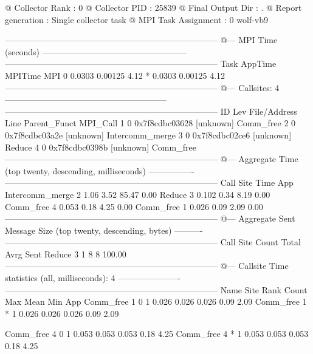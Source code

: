 \begin{Output}
@ Collector Rank           : 0
@ Collector PID            : 25839
@ Final Output Dir         : .
@ Report generation        : Single collector task
@ MPI Task Assignment      : 0 wolf-vb9

---------------------------------------------------------------------------
@--- MPI Time (seconds) ---------------------------------------------------
---------------------------------------------------------------------------
Task  AppTime   MPITime     MPI%
0     0.0303    0.00125     4.12
*     0.0303    0.00125     4.12
---------------------------------------------------------------------------
@--- Callsites: 4 ---------------------------------------------------------
---------------------------------------------------------------------------
ID Lev File/Address        Line Parent_Funct             MPI_Call
1   0 0x7f8cdbc03628           [unknown]                Comm_free
2   0 0x7f8cdbc03a2e           [unknown]                Intercomm_merge
3   0 0x7f8cdbc02ce6           [unknown]                Reduce
4   0 0x7f8cdbc0398b           [unknown]                Comm_free
---------------------------------------------------------------------------
@--- Aggregate Time (top twenty, descending, milliseconds) ----------------
---------------------------------------------------------------------------
Call                 Site       Time    App%
Intercomm_merge         2       1.06    3.52   85.47    0.00
Reduce                  3      0.102    0.34    8.19    0.00
Comm_free               4      0.053    0.18    4.25    0.00
Comm_free               1      0.026    0.09    2.09    0.00
---------------------------------------------------------------------------
@--- Aggregate Sent Message Size (top twenty, descending, bytes) ----------
---------------------------------------------------------------------------
Call                 Site      Count      Total       Avrg  Sent%
Reduce                  3          1          8          8 100.00
---------------------------------------------------------------------------
@--- Callsite Time statistics (all, milliseconds): 4 ----------------------
---------------------------------------------------------------------------
Name              Site Rank  Count      Max     Mean      Min   App%
Comm_free            1    0      1    0.026    0.026    0.026   0.09   2.09
Comm_free            1    *      1    0.026    0.026    0.026   0.09   2.09

Comm_free            4    0      1    0.053    0.053    0.053   0.18   4.25
Comm_free            4    *      1    0.053    0.053    0.053   0.18   4.25


\end{Output}
